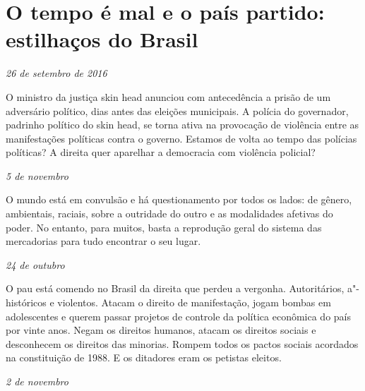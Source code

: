 \chapter{O tempo é mal e o país partido: estilhaços do Brasil}

\begin{flushright}
\emph{26 de setembro de 2016}
\end{flushright}

O ministro da justiça skin head anunciou com antecedência a prisão de um
adversário político, dias antes das eleições municipais. A polícia do
governador, padrinho político do skin head, se torna ativa na provocação
de violência entre as manifestações políticas contra o governo. Estamos
de volta ao tempo das polícias políticas? A direita quer aparelhar a
democracia com violência policial?

\begin{flushright}
\emph{5 de novembro}
\end{flushright}

O mundo está em convulsão e há questionamento por todos os lados: de
gênero, ambientais, raciais, sobre a outridade do outro e as modalidades
afetivas do poder. No entanto, para muitos, basta a reprodução geral do
sistema das mercadorias para tudo encontrar o seu lugar.

\begin{flushright}
\emph{24 de outubro}
\end{flushright}

O pau está comendo no Brasil da direita que perdeu a vergonha.
Autoritários, a"-históricos e violentos. Atacam o direito de
manifestação, jogam bombas em adolescentes e querem passar projetos de
controle da política econômica do país por vinte anos. Negam os direitos
humanos, atacam os direitos sociais e desconhecem os direitos das
minorias. Rompem todos os pactos sociais acordados na constituição de
1988. E os ditadores eram os petistas eleitos.

\begin{flushright}
\emph{2 de novembro}
\end{flushright}

